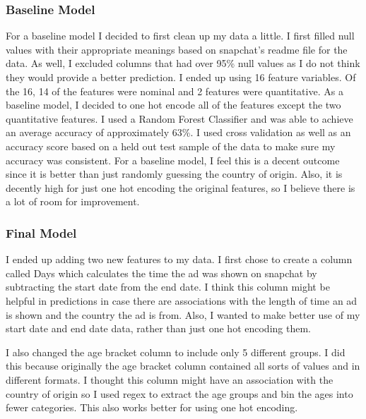 \documentclass[11pt]{article}
\begin{document}
\subsubsection{Baseline Model}\label{baseline-model}

For a baseline model I decided to first clean up my data a little. I
first filled null values with their appropriate meanings based on
snapchat's readme file for the data. As well, I excluded columns that
had over 95\% null values as I do not think they would provide a better
prediction. I ended up using 16 feature variables. Of the 16, 14 of the
features were nominal and 2 features were quantitative. As a baseline
model, I decided to one hot encode all of the features except the two
quantitative features. I used a Random Forest Classifier and was able to
achieve an average accuracy of approximately 63\%. I used cross
validation as well as an accuracy score based on a held out test sample
of the data to make sure my accuracy was consistent. For a baseline
model, I feel this is a decent outcome since it is better than just
randomly guessing the country of origin. Also, it is decently high for
just one hot encoding the original features, so I believe there is a lot
of room for improvement.

\subsubsection{Final Model}\label{final-model}

I ended up adding two new features to my data. I first chose to create a
column called Days which calculates the time the ad was shown on
snapchat by subtracting the start date from the end date. I think this
column might be helpful in predictions in case there are associations
with the length of time an ad is shown and the country the ad is from.
Also, I wanted to make better use of my start date and end date data,
rather than just one hot encoding them.

I also changed the age bracket column to include only 5 different
groups. I did this because originally the age bracket column contained
all sorts of values and in different formats. I thought this column
might have an association with the country of origin so I used regex to
extract the age groups and bin the ages into fewer categories. This also
works better for using one hot encoding.
\end{document}
